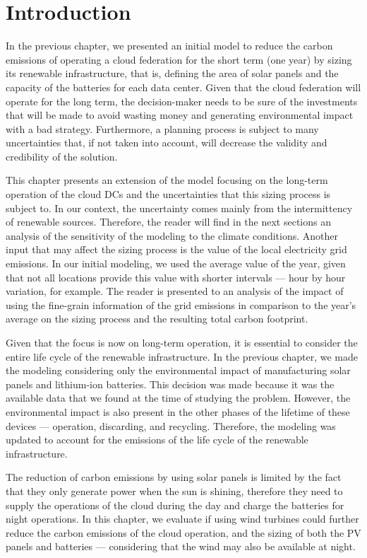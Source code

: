 \section{Introduction}

In the previous chapter, we presented an initial model to reduce the carbon emissions of operating a cloud federation for the short term (one year) by sizing its renewable infrastructure, that is, defining the area of solar panels and the capacity of the batteries for each data center. Given that the cloud federation will operate for the long term, the decision-maker needs to be sure of the investments that will be made to avoid wasting money and generating environmental impact with a bad strategy. Furthermore, a planning process is subject to many uncertainties that, if not taken into account, will decrease the validity and credibility of the solution.

This chapter presents an extension of the model focusing on the long-term operation of the cloud DCs and the uncertainties that this sizing process is subject to. In our context, the uncertainty comes mainly from the intermittency of renewable sources. Therefore, the reader will find in the next sections an analysis of the sensitivity of the modeling to the climate conditions. Another input that may affect the sizing process is the value of the local electricity grid emissions. In our initial modeling, we used the average value of the year, given that not all locations provide this value with shorter intervals --- hour by hour variation, for example. The reader is presented to an analysis of the impact of using the fine-grain information of the grid emissions in comparison to the year's average on the sizing process and the resulting total carbon footprint.

Given that the focus is now on long-term operation, it is essential to consider the entire life cycle of the renewable infrastructure. In the previous chapter, we made the modeling considering only the environmental impact of manufacturing solar panels and lithium-ion batteries. This decision was made because it was the available data that we found at the time of studying the problem. However, the environmental impact is also present in the other phases of the lifetime of these devices --- operation, discarding, and recycling. Therefore, the modeling was updated to account for the emissions of the life cycle of the renewable infrastructure. 

The reduction of carbon emissions by using solar panels is limited by the fact that they only generate power when the sun is shining, therefore they need to supply the operations of the cloud during the day and charge the batteries for night operations. In this chapter, we evaluate if using wind turbines could further reduce the carbon emissions of the cloud operation, and the sizing of both the PV panels and batteries --- considering that the wind may also be available at night.

